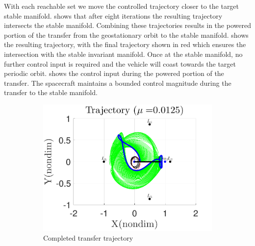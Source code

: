\documentclass[smallcondensed]{svjour3}
\begin{document}
With each reachable set we move the controlled trajectory closer to the target stable manifold.
 shows that after eight iterations the resulting trajectory intersects the stable manifold. 
Combining these trajectories results in the powered portion of the transfer from the geostationary orbit to the stable manifold. 
 shows the resulting trajectory, with the final trajectory shown in red which ensures the intersection with the stable invariant manifold.
Once at the stable manifold, no further control input is required and the vehicle will coast towards the target periodic orbit.
 shows the control input during the powered portion of the transfer. 
The spacecraft maintains a bounded control magnitude during the transfer to the stable manifold.
\begin{figure} 
        \centering 
        \begin{subfigure}[htbp]{0.5\textwidth} 
                \includegraphics[width=\textwidth]{geo_transfer_full} 
                \caption{Completed transfer trajectory} \label{fig:geo_transfer_full} 
        \end{subfigure}~ %
        \begin{subfigure}[htbp]{0.5\textwidth} 

\end{subfigure}
\end{figure}
\end{document}
